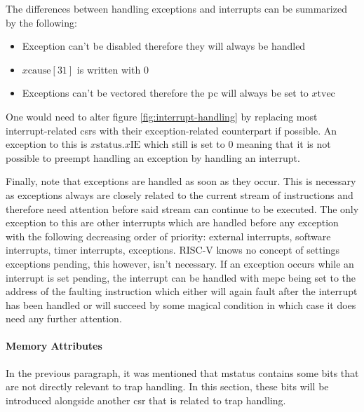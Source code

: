 The differences between handling exceptions and interrupts can be summarized by the following:
\begin{itemize}
    \item Exception can't be disabled therefore they will always be handled
    \item $ x\text{cause}[31] $ is written with $ 0 $
    \item Exceptions can't be vectored therefore the \gls{pc} will always be set to $ x\text{tvec} $
\end{itemize}

One would need to alter figure \ref{fig:interrupt-handling} by replacing most interrupt-related \glspl{csr} with their exception-related counterpart if possible.
An exception to this is $ x\text{status}.x\text{IE} $ which still is set to 0 meaning that it is not possible to preempt handling an exception by handling an interrupt.

Finally, note that exceptions are handled as soon as they occur.
This is necessary as exceptions always are closely related to the current stream of instructions and therefore need attention before said stream can continue to be executed.
The only exception to this are other interrupts which are handled before any exception with the following decreasing order of priority: external interrupts, software interrupts, timer interrupts, exceptions.
RISC-V knows no concept of settings exceptions pending, this however, isn't necessary.
If an exception occurs while an interrupt is set pending, the interrupt can be handled with \gls{mepc} being set to the address of the faulting instruction which either will again fault after the interrupt has been handled or will succeed by some magical condition in which case it does need any further attention.


\paragraph{Memory Attributes}
\label{sec:memory-attrs}

In the previous paragraph, it was mentioned that \gls{mstatus} contains some bits that are not directly relevant to trap handling.
In this section, these bits will be introduced alongside another \gls{csr} that is related to trap handling.

